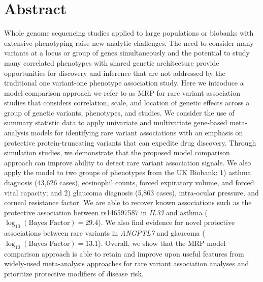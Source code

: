 \section*{Abstract}
Whole genome sequencing studies applied to large populations or biobanks with extensive phenotyping raise new analytic challenges. The need to consider many variants at a locus or group of genes simultaneously and the potential to study many correlated phenotypes with shared genetic architecture provide opportunities for discovery and inference that are not addressed by the traditional one variant-one phenotype association study. Here we introduce a model comparison approach we refer to as MRP for rare variant association studies that considers correlation, scale, and location of genetic effects across a group of genetic variants, phenotypes, and studies. We consider the use of summary statistic data to apply univariate and multivariate gene-based meta-analysis models for identifying rare variant associations with an emphasis on protective protein-truncating variants that can expedite drug discovery. Through simulation studies, we demonstrate that the proposed model comparison approach can improve ability to detect rare variant association signals. We also apply the model to two groups of phenotypes from the UK Biobank: 1) asthma diagnosis (43,626 cases), eosinophil counts, forced expiratory volume, and forced vital capacity; and 2) glaucoma diagnosis (5,863 cases), intra-ocular pressure, and corneal resistance factor. We are able to recover known associations such as the protective association between rs146597587 in \textit{IL33} and asthma ($\log_{10} \left( \textrm{Bayes Factor}\right) = 29.4$). We also find evidence for novel protective associations between rare variants in \textit{ANGPTL7} and glaucoma ($\log_{10} \left( \textrm{Bayes Factor}\right) = 13.1$). Overall, we show that the MRP model comparison approach is able to retain and improve upon useful features from widely-used meta-analysis approaches for rare variant association analyses and prioritize protective modifiers of disease risk.

